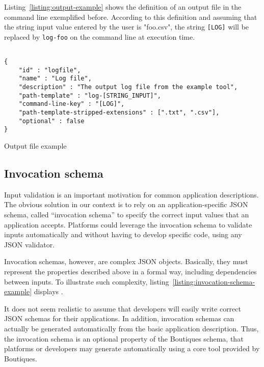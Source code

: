 \documentclass{article}
\newcommand{\todo}[2]{\pdfmargincomment[color=red,author=#1,open=true]{#2}}
\begin{document}
Listing~\ref{listing:output-example} shows the definition of an output
file in the command line exemplified before. According to this
definition and assuming that the string input value entered by the
user is "foo.csv", the string \texttt{[LOG]} will be
replaced by \texttt{log-foo} on the command line at execution time.

\begin{listing}
\begin{verbatim}

{
    "id" : "logfile",
    "name" : "Log file",
    "description" : "The output log file from the example tool",
    "path-template" : "log-[STRING_INPUT]",
    "command-line-key" : "[LOG]",
    "path-template-stripped-extensions" : [".txt", ".csv"],
    "optional" : false
}
\end{verbatim}
\caption{Output file example} 
\label{listing:output-example}
\end{listing}

\subsection{Invocation schema}
\label{sec:invocation-schema}

Input validation is an important motivation for common application
descriptions. The obvious solution in our context is to rely on an
application-specific JSON schema, called ``invocation schema'' to
specify the correct input values that an application
accepts. Platforms could leverage the invocation schema to validate
inputs automatically and without having to develop specific code,
using any JSON validator.

Invocation schemas, however, are complex JSON objects. Basically, they
must represent the properties described above in a formal way,
including dependencies between inputs. To illustrate such complexity,
listing~\ref{listing:invocation-schema-example} displays
\todo{Tristan}{...}. %

It does not seem realistic to assume that
developers will easily write correct JSON schemas for their
applications. In addition, invocation schemas can actually be
generated automatically from the basic application description. Thus,
the invocation schema is an optional property of the Boutiques schema,
that platforms or developers may generate automatically using a core
tool provided by Boutiques.
\end{document}
